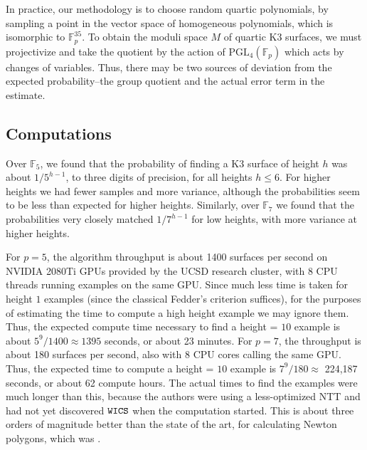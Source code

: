 In practice, our methodology is to choose
random quartic polynomials,
by sampling a point in the vector space
of homogeneous polynomials, which is isomorphic to
\(\mathbb{F}_{p}^{35}\).
To obtain the moduli space \(M\) of quartic K3 surfaces, 
we must projectivize and take the quotient by the action of 
\(\text{PGL}_{4}(\mathbb{F}_{p})\) which acts by changes of variables. 
Thus, there may be two sources of deviation from the expected
probability--the group quotient and the actual 
error term in the estimate.

\subsection{Computations}
\label{subsec:computations}
Over \(\mathbb{F}_{5}\), we 
found that the probability of finding a K3 surface
of height \(h\) was about \(1 / 5^{h-1}\), to three digits
of precision, for all heights \(h \leq 6\).
For higher heights we had fewer samples
and more variance, although
the probabilities seem to be less than expected
for higher heights.
Similarly, over \(\mathbb{F}_{7}\) we found that
the probabilities very closely matched \(1 / 7^{h-1}\)
for low heights, with more variance at higher heights.

For \(p=5\), the algorithm throughput is about
1400 surfaces per second on 
NVIDIA 2080Ti GPUs provided by the
UCSD research cluster, with 8 CPU threads running
examples on the same GPU.
Since much less time is taken for height \(1\) examples
(since the classical Fedder's criterion suffices), 
for the purposes of estimating the time to compute a
high height example we may ignore them.
Thus,
the expected compute time necessary to find a height = \(10\) 
example is about  \(5^{9} / 1400 \approx 1395\) seconds, or about 
23 minutes.
For \(p=7\), the throughput is about 180 surfaces
per second, also with 8 CPU cores calling the same GPU.
Thus, the expected time to compute
a height = \(10\) example is 
\(7^{9} / 180 \approx \) 224,187 seconds, or about
62 compute hours.
The actual times to find the examples were much 
longer than this, because the authors were using a 
less-optimized NTT and had not yet discovered $\texttt{WICS}$
when the computation started.
This is about three orders of magnitude better than the state of the art,
for calculating Newton polygons, which was \cite{fgmqt-2025-witt-vectors-macaulay2}.

